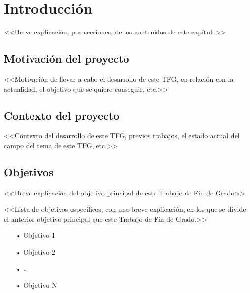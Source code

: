 \chapter{Introducción} \label{chp:intro}

<<Breve explicación, por secciones, de los contenidos de este capítulo>>


\section{Motivación del proyecto} \label{sct:intro:motivacion}

<<Motivación de llevar a cabo el desarrollo de este TFG, en relación con la actualidad, el objetivo que se quiere conseguir, etc.>>


\section{Contexto del proyecto} \label{sct:intro:contexto}

<<Contexto del desarrollo de este TFG, previos trabajos, el estado actual del campo del tema de este TFG, etc.>>


\section{Objetivos} \label{sct:intro:objetivos}

<<Breve explicación del objetivo principal de este Trabajo de Fin de Grado>>

<<Lista de objetivos específicos, con una breve explicación, en los que se divide el anterior objetivo principal que este Trabajo de Fin de Grado.>>

\begin{itemize}

    \item[•] Objetivo 1

    \item[•] Objetivo 2

    \item[•] \ldots

    \item[•] Objetivo N

\end{itemize}

